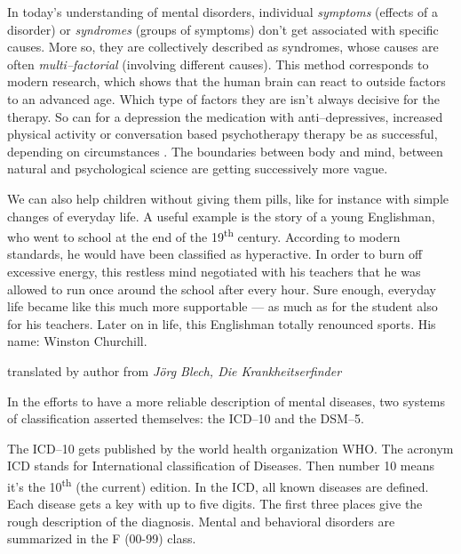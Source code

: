 \documentclass[../main.tex]{subfiles}
\begin{document}
\vspace{5mm}

In today's understanding of mental disorders, individual \emph{symptoms} (effects of a disorder)
or \emph{syndromes} (groups of symptoms) don't get associated with specific causes.
More so, they are collectively described as syndromes, whose causes are often \emph{multi--factorial} (involving different causes).
This method corresponds to modern research, which shows that the human brain can react to outside factors to an advanced age.
Which type of factors they are isn't always decisive for the therapy.
So can for a depression the medication with anti--depressives,
increased physical activity or conversation based psychotherapy therapy be as successful, depending on circumstances .
The boundaries between body and mind, between natural  and psychological science are getting successively more vague.

\setlength{\epigraphwidth}{0.8\textwidth}
\epigraph{We can also help children without giving them pills, like for instance with simple changes of everyday life.
  A useful example is the story of a young Englishman, who went to school at the end of the 19\textsuperscript{th} century.
  According to modern standards, he would have been classified as hyperactive.
  In order to burn off excessive energy, this restless mind negotiated with his teachers that he was allowed to run once around the
  school after every hour.
  Sure enough, everyday life became like this much more supportable --- as much as for the student also for his teachers.
  Later on in life, this Englishman totally renounced sports.
  His name: Winston Churchill.}{translated by author from \textit{J\"org Blech, Die Krankheitserfinder}}
\setlength{\epigraphwidth}{0.4\textwidth}


In the efforts to have a more reliable description of mental diseases,
two systems of classification asserted themselves: the ICD--10 and the DSM--5.


The ICD--10 gets published by the world health organization WHO.
The acronym ICD stands for International classification of Diseases.
Then number 10 means it's the 10\textsuperscript{th} (the current) edition.
In the ICD, all known diseases are defined.
Each disease gets a key with up to five digits.
The first three places give the rough description of the diagnosis.
Mental and behavioral disorders are summarized in the F (00-99) class.
\end{document}
